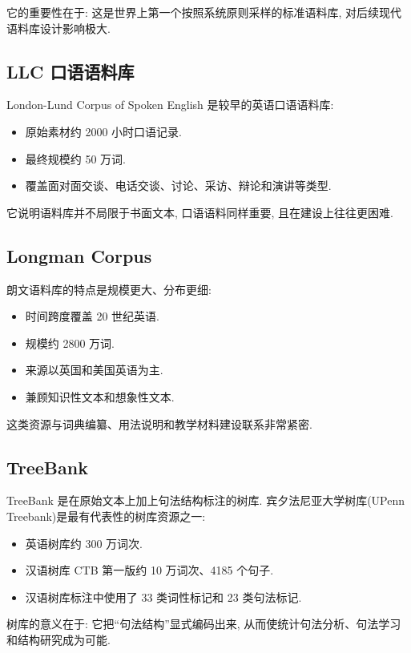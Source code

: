 它的重要性在于:
这是世界上第一个按照系统原则采样的标准语料库, 对后续现代语料库设计影响极大.

\subsection{LLC 口语语料库}


London-Lund Corpus of Spoken English 是较早的英语口语语料库:

\begin{itemize}
\item 原始素材约 2000 小时口语记录.
\item 最终规模约 50 万词.
\item 覆盖面对面交谈、电话交谈、讨论、采访、辩论和演讲等类型.
\end{itemize}

它说明语料库并不局限于书面文本, 口语语料同样重要, 且在建设上往往更困难.

\subsection{Longman Corpus}


朗文语料库的特点是规模更大、分布更细:

\begin{itemize}
\item 时间跨度覆盖 20 世纪英语.
\item 规模约 2800 万词.
\item 来源以英国和美国英语为主.
\item 兼顾知识性文本和想象性文本.
\end{itemize}

这类资源与词典编纂、用法说明和教学材料建设联系非常紧密.

\subsection{TreeBank}


TreeBank 是在原始文本上加上句法结构标注的树库.
宾夕法尼亚大学树库(UPenn Treebank)是最有代表性的树库资源之一:

\begin{itemize}
\item 英语树库约 300 万词次.
\item 汉语树库 CTB 第一版约 10 万词次、4185 个句子.
\item 汉语树库标注中使用了 33 类词性标记和 23 类句法标记.
\end{itemize}

树库的意义在于:
它把“句法结构”显式编码出来, 从而使统计句法分析、句法学习和结构研究成为可能.

